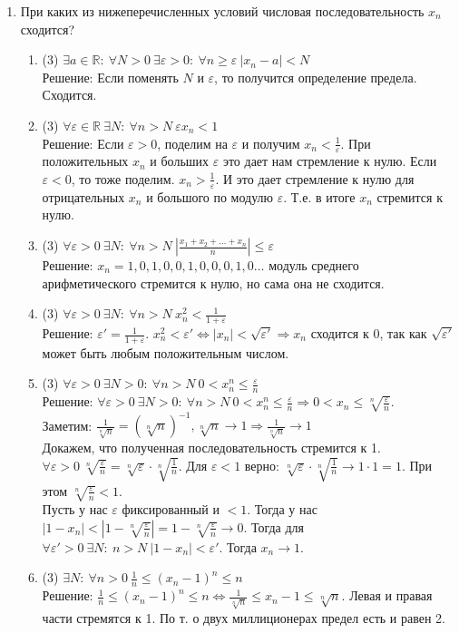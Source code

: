 \documentclass[a4paper]{article}
\def\eps{\varepsilon}
\begin{document}
\begin{enumerate}
	\item При каких из нижеперечисленных условий числовая последовательность $x_n$ сходится?
	\begin{enumerate}
	    \item (3) $\exists a\in \mathbb R:\ \forall N>0\ \exists \eps>0:\ \forall n\geq\eps\ |x_n - a|<N$\\
        Решение: Если поменять $N$ и $\eps$, то получится определение предела. Сходится.
	    \item (3) $\forall \eps\in \mathbb R\ \exists N:\ \forall n>N\ \eps x_n < 1$\\
	    Решение: Если $\eps > 0$, поделим на $\eps$ и получим $x_n < \frac{1}{\eps}$. При положительных $x_n$ и больших $\eps$ это дает нам стремление к нулю. Если $\eps < 0$, то тоже поделим. $x_n > \frac{1}{\eps}$. И это дает стремление к нулю для отрицательных $x_n$ и большого по модулю $\eps$. Т.е. в итоге $x_n$ стремится к нулю.
	    \item (3) $\forall \eps>0\ \exists N:\ \forall n>N\ \left|\frac{x_1+x_2+\dots + x_n}{n}\right|\leq \eps$\\
	    Решение: $x_n = 1, 0, 1, 0, 0, 1, 0, 0, 0, 1, 0 \dots$ модуль среднего арифметического стремится к нулю, но сама она не сходится.
	    \item (3) $\forall \eps>0\ \exists N:\ \forall n>N\ x_n^2<\frac{1}{1+\eps}$\\
        Решение: $\eps' = \frac{1}{1+\eps}$. $x_n^2 < \eps' \Leftrightarrow |x_n| < \sqrt{\eps'} \Rightarrow x_n$ сходится к 0, так как $\sqrt{\eps'}$ может быть любым положительным числом.
        \item (3) $\forall\eps>0\ \exists N>0:\ \forall n>N\ 0<x_n^n\leq \frac{\eps}{n}$\\
	    Решение: $\forall\eps>0\ \exists N>0:\ \forall n>N\ 0<x_n^n\leq \frac{\eps}{n} \Rightarrow 0<x_n \leq \sqrt[n]{\frac{\eps}{n}}$.\\
        Заметим: $\frac{1}{\sqrt[n]{n}} = (\sqrt[n]{n})^{-1}, \sqrt[n]{n} \rightarrow 1 \Rightarrow \frac{1}{\sqrt[n]{n}} \rightarrow 1$\\
        Докажем, что полученная последовательность стремится к 1.\\
        $\forall \eps > 0\ {\sqrt[n]{\frac{\eps}{n}}} = \sqrt[n]{\eps}\cdot \sqrt[n]{\frac{1}{n}}$. Для $\eps < 1$ верно: $\sqrt[n]{\eps}\cdot \sqrt[n]{\frac{1}{n}} \rightarrow 1\cdot 1 = 1$. При этом $\sqrt[n]{\frac{\eps}{n}} < 1$.\\
        Пусть у нас $\eps$ фиксированный и $< 1$. Тогда у нас $|1 - x_n| < |1 - \sqrt[n]{\frac{\eps}{n}}| = 1 - \sqrt[n]{\frac{\eps}{n}} \rightarrow 0$. Тогда для $\forall \eps' > 0\ \exists N:\ n > N\ |1 - x_n| < \eps'$. Тогда $x_n \rightarrow 1$.
        \item (3) $\exists N:\ \forall n>0\ \frac{1}{n}\leq (x_n - 1)^n \leq n$\\
        Решение: $\frac{1}{n}\leq (x_n - 1)^n \leq n \Leftrightarrow \frac{1}{\sqrt[n]{n}} \le x_n - 1 \le \sqrt[n]{n}$. Левая и правая части стремятся к 1. По т. о двух миллиционерах предел есть и равен 2.
	\end{enumerate}
    

\end{enumerate}
\end{document}
